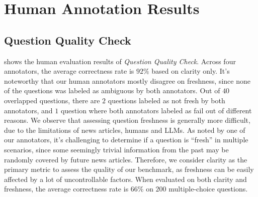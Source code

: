 \documentclass[11pt]{article}
\begin{document}



\clearpage
\section{Human Annotation Results}
\label{sec:human_annotation_results}

\subsection{Question Quality Check}
 shows the human evaluation results of \emph{Question Quality Check}.
Across four annotators, the average correctness rate is $92\%$ based on clarity only.
It's noteworthy that our human annotators mostly disagree on freshness, since none of the questions was labeled as ambiguous by both annotators. 
Out of $40$ overlapped questions, there are $2$ questions labeled as not fresh by both annotators, and $1$ question where both annotators labeled as fail out of different reasons.
We observe that assessing question freshness is generally more difficult, due to the limitations of news articles, humans and LLMs.
As noted by one of our annotators, it's challenging to determine if a question is ``fresh'' in multiple scenarios, since some seemingly trivial information from the past may be randomly covered by future news articles.
Therefore, we consider clarity as the primary metric to assess the quality of our benchmark, as freshness can be easily affected by a lot of uncontrollable factors.
When evaluated on both clarity and freshness, the average correctness rate is $66\%$ on $200$ multiple-choice questions.
\end{document}
